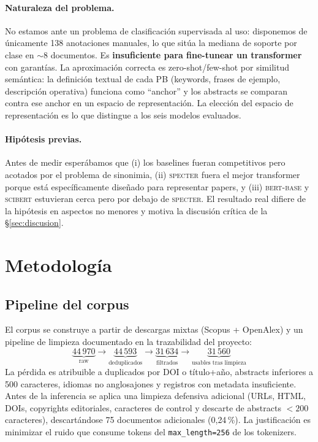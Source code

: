 \documentclass[11pt,a4paper]{article}
\begin{document}
\paragraph{Naturaleza del problema.} No estamos ante un problema de clasificación supervisada al uso: disponemos de únicamente 138 anotaciones manuales, lo que sitúa la mediana de soporte por clase en $\sim$8 documentos. Es \textbf{insuficiente para fine-tunear un transformer} con garantías. La aproximación correcta es zero-shot/few-shot por similitud semántica: la definición textual de cada PB (keywords, frases de ejemplo, descripción operativa) funciona como ``anchor'' y los abstracts se comparan contra ese anchor en un espacio de representación. La elección del espacio de representación es lo que distingue a los seis modelos evaluados.

\paragraph{Hipótesis previas.} Antes de medir esperábamos que (i) los baselines fueran competitivos pero acotados por el problema de sinonimia, (ii) \textsc{specter} fuera el mejor transformer porque está específicamente diseñado para representar papers, y (iii) \textsc{bert-base} y \textsc{scibert} estuvieran cerca pero por debajo de \textsc{specter}. El resultado real difiere de la hipótesis en aspectos no menores y motiva la discusión crítica de la §\ref{sec:discusion}.

\section{Metodología}

\subsection{Pipeline del corpus}

El corpus se construye a partir de descargas mixtas (Scopus + OpenAlex) y un pipeline de limpieza documentado en la trazabilidad del proyecto:
\[
\underbrace{44\,970}_{\text{raw}} \longrightarrow \underbrace{44\,593}_{\text{deduplicados}} \longrightarrow \underbrace{31\,634}_{\text{filtrados}} \longrightarrow \underbrace{31\,560}_{\text{usables tras limpieza}}
\]
La pérdida es atribuible a duplicados por DOI o título+año, abstracts inferiores a 500 caracteres, idiomas no anglosajones y registros con metadata insuficiente. Antes de la inferencia se aplica una limpieza defensiva adicional (URLs, HTML, DOIs, copyrights editoriales, caracteres de control y descarte de abstracts $<200$ caracteres), descartándose 75 documentos adicionales (0{,}24\,\%). La justificación es minimizar el ruido que consume tokens del \texttt{max\_length=256} de los tokenizers.
\end{document}

